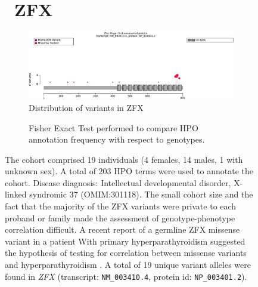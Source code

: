 \begin{figure}[htbp]
\section*{ ZFX}
\centering
\begin{subfigure}[b]{0.95\textwidth}
\centering
\includegraphics[width=\textwidth]{ img/ZFX_protein_diagram.pdf} 
\captionsetup{justification=raggedright,singlelinecheck=false}
\caption{Distribution of variants in ZFX}
\end{subfigure}

\vspace{2em}

\begin{subfigure}[b]{0.95\textwidth}
\centering
{}
\captionsetup{justification=raggedright,singlelinecheck=false}
\caption{Fisher Exact Test performed to compare HPO annotation frequency with respect to genotypes.}
\end{subfigure}

\vspace{2em}
\caption{ The cohort comprised 19 individuals (4 females, 14 males, 1 with unknown sex). A total of 203 HPO terms were used to annotate the cohort. Disease diagnosis: Intellectual developmental disorder, X-linked syndromic 37 (OMIM:301118). The small cohort size and the fact that the majority of the ZFX variants were private to each proband or 
family made the assessment of genotype-phenotype correlation difficult. A recent report of a
germline ZFX missense variant in a patient With primary hyperparathyroidism suggested the hypothesis of
testing for correlation between missense variants and hyperparathyroidism \cite{PMID_38325380,PMID_39056049}. A total of 19 unique variant alleles were found in \textit{ZFX} (transcript: \texttt{NM\_003410.4}, protein id: \texttt{NP\_003401.2}).}
\end{figure}
